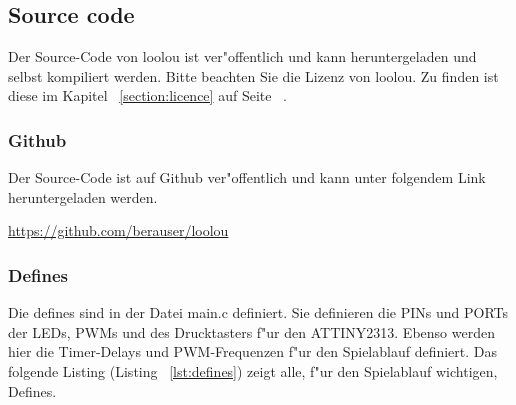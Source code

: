 \newpage
\subsection{Source code}

Der Source-Code von loolou ist ver"offentlich und kann heruntergeladen und selbst kompiliert werden.
Bitte beachten Sie die Lizenz von loolou. Zu finden ist diese im Kapitel ~\ref{section:licence} auf Seite ~\pageref{section:licence}.
\subsubsection{Github}\label{subsubsection:github}

Der Source-Code ist auf Github ver"offentlich und kann unter folgendem Link heruntergeladen werden. \\
\begin{center}\href{https://github.com/berauser/loolou}{https://github.com/berauser/loolou}\end{center}
\vspace{0.5cm}

\subsubsection{Defines}

Die defines sind in der Datei main.c definiert. Sie definieren die PINs und PORTs der LEDs, PWMs und des Drucktasters f"ur den ATTINY2313.
Ebenso werden hier die Timer-Delays und PWM-Frequenzen f"ur den Spielablauf definiert. Das folgende Listing (Listing ~\ref{lst:defines}) zeigt alle, f"ur den Spielablauf wichtigen, Defines. 


